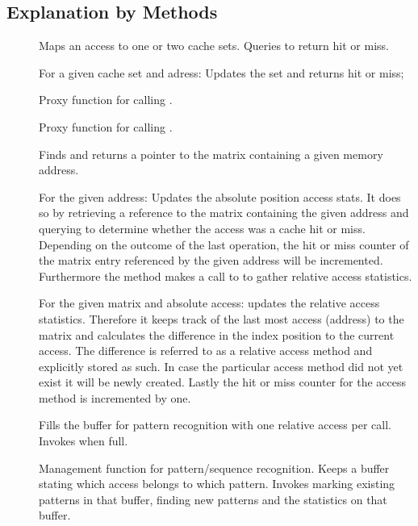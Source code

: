 \subsection{Explanation by Methods}

\begin{description} %
\item[] Maps an access to one or two cache sets. Queries  to return hit or miss.
\item[] For a given cache set and adress: Updates the set and returns hit or miss;
\item[] Proxy function for calling .
\item[] Proxy function for calling .
\item[] Finds and returns a pointer to the matrix containing a given memory address.
\item[] For the given address: Updates the absolute position
    access stats. It does so by retrieving a reference to the matrix containing the given address and
    querying  to determine whether the access was a cache hit or miss. Depending on the outcome
    of the last operation, the hit or miss counter of the matrix entry referenced by the given address will be incremented.
    Furthermore the method makes a call to  to gather relative access statistics.
\item[] For
    the given matrix and absolute access: updates the relative access statistics. Therefore it keeps track of the last most
    access (address) to the matrix and calculates the difference in the index position to the current access. The
    difference is referred to as a relative access method and explicitly stored as such. In case the particular access
    method did not yet exist it will be newly created. Lastly the hit or miss counter for the access method is incremented
    by one.
\item[] Fills the buffer for pattern recognition with one relative access per call. Invokes  when full.
\item[] Management function for pattern/sequence recognition. Keeps a buffer stating which access belongs to which pattern. Invokes marking existing patterns in that buffer, finding new patterns and the statistics on that buffer.

\end{description}
